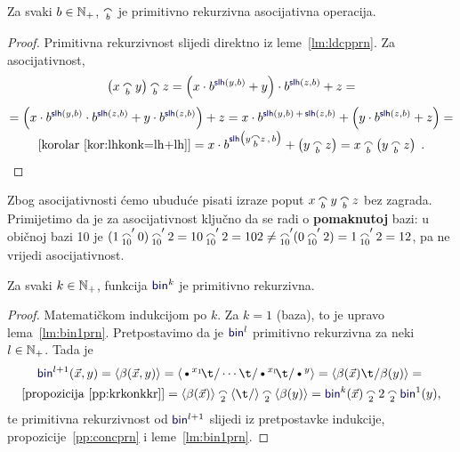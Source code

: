 \begin{propozicija}[{name=[primitivna rekurzivnost i asocijativnost konkatenacije]}]\label{pp:concprn}
Za svaki $b\in{\mathbb N}_+$, $\conc b$ je primitivno rekurzivna asocijativna operacija.
\end{propozicija}
\begin{proof}
Primitivna rekurzivnost slijedi direktno iz leme~\ref{lm:ldcpprn}. Za asocijativnost,
\begin{multline}
    \left(x\conc b y\right)\conc b z=\left(x\cdot b^{\f{slh}(y,b)}+y\right)\cdot b^{\f{slh}(z,b)}+z=\\[1mm]
    =\left(x\cdot b^{\f{slh}(y,b)}\cdot b^{\f{slh}(z,b)}+y\cdot b^{\f{slh}(z,b)}\right)+z=
    x\cdot b^{\f{slh}(y,b)\,+\,\f{slh}(z,b)}+\left(y\cdot b^{\f{slh}(z,b)}+z\right)=\\[-1mm]
    \text{[korolar~\ref{kor:lhkonk=lh+lh}]}{}=x\cdot b^{\f{slh}\bigl(y\conc b z\,,\,b\bigr)}+\left(y\conc b z\right)=x\conc b\left(y\conc b z\right)\text{\qedhere\;.}
\end{multline}
\end{proof}
Zbog asocijativnosti ćemo ubuduće pisati izraze poput $x\conc by\conc bz$ bez zagrada. Primijetimo da je za asocijativnost ključno da se radi o \textbf{pomaknutoj} bazi: u običnoj bazi 10 je $(1\conc{10}'0)\conc{10}'2=10\conc{10}'2=102\ne\conc{10}'(0\conc{10}'2)=1\conc{10}'2=12$, pa ne vrijedi asocijativnost.

\begin{propozicija}[{name=[primitivna rekurzivnost višemjesnog binarnog kodiranja]}]\label{pp:binkprn}
Za svaki $k\in{\mathbb N}_+$, funkcija $\f{bin}^k$ je primitivno rekurzivna.
\end{propozicija}
\begin{proof}
Matematičkom indukcijom po $k$. Za $k=1$ (baza), to je upravo lema~\ref{lm:bin1prn}. Pretpostavimo da je $\f{bin}^l$ primitivno rekurzivna za neki $l\in{\mathbb N}_+$. Tada je
\begin{multline}
    \f{bin}^{l+1}(\vec x,y)=
    \kr{\beta(\vec x,y)}=
    \kr{\text\textbullet^{x_1}\!\t/\dotsm\t/\text\textbullet^{x_l}\!\t/\text\textbullet^y}=
    \kr{\beta(\vec x)\t/\beta(y)}={}\\
    \text{[propozicija~\ref{pp:krkonkkr}]}{}=\kr{\beta(\vec x)}\conc 2\kr{\t/}\conc 2\kr{\beta(y)}=
    \f{bin}^k(\vec x)\conc22\conc2\f{bin}^1(y)\text,
\end{multline}
te primitivna rekurzivnost od $\f{bin}^{l+1}$ slijedi iz pretpostavke indukcije, propozicije~\ref{pp:concprn} i leme~\ref{lm:bin1prn}.
\end{proof}


